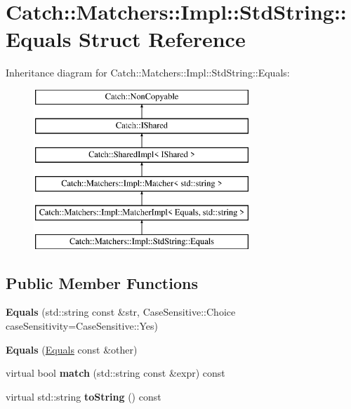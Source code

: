\hypertarget{structCatch_1_1Matchers_1_1Impl_1_1StdString_1_1Equals}{}\section{Catch\+:\+:Matchers\+:\+:Impl\+:\+:Std\+String\+:\+:Equals Struct Reference}
\label{structCatch_1_1Matchers_1_1Impl_1_1StdString_1_1Equals}
Inheritance diagram for Catch\+:\+:Matchers\+:\+:Impl\+:\+:Std\+String\+:\+:Equals\+:\begin{figure}[H]
\begin{center}
\leavevmode
\includegraphics[height=6.000000cm]{structCatch_1_1Matchers_1_1Impl_1_1StdString_1_1Equals}
\end{center}
\end{figure}
\subsection*{Public Member Functions}
\begin{DoxyCompactItemize}
\item 
{\bfseries Equals} (std\+::string const \&str, Case\+Sensitive\+::\+Choice case\+Sensitivity=Case\+Sensitive\+::\+Yes)\hypertarget{structCatch_1_1Matchers_1_1Impl_1_1StdString_1_1Equals_a5921d5ed75320fb64a678e3f1292a464}{}\label{structCatch_1_1Matchers_1_1Impl_1_1StdString_1_1Equals_a5921d5ed75320fb64a678e3f1292a464}

\item 
{\bfseries Equals} (\hyperlink{structCatch_1_1Matchers_1_1Impl_1_1StdString_1_1Equals}{Equals} const \&other)\hypertarget{structCatch_1_1Matchers_1_1Impl_1_1StdString_1_1Equals_acaa97de06aedf363ae803d65a975f5e4}{}\label{structCatch_1_1Matchers_1_1Impl_1_1StdString_1_1Equals_acaa97de06aedf363ae803d65a975f5e4}

\item 
virtual bool {\bfseries match} (std\+::string const \&expr) const \hypertarget{structCatch_1_1Matchers_1_1Impl_1_1StdString_1_1Equals_a00c8259a76c24da669e116662ededc70}{}\label{structCatch_1_1Matchers_1_1Impl_1_1StdString_1_1Equals_a00c8259a76c24da669e116662ededc70}

\item 
virtual std\+::string {\bfseries to\+String} () const \hypertarget{structCatch_1_1Matchers_1_1Impl_1_1StdString_1_1Equals_a7a09449ff2f858981caf3b1f6c36d270}{}\label{structCatch_1_1Matchers_1_1Impl_1_1StdString_1_1Equals_a7a09449ff2f858981caf3b1f6c36d270}

\end{DoxyCompactItemize}
